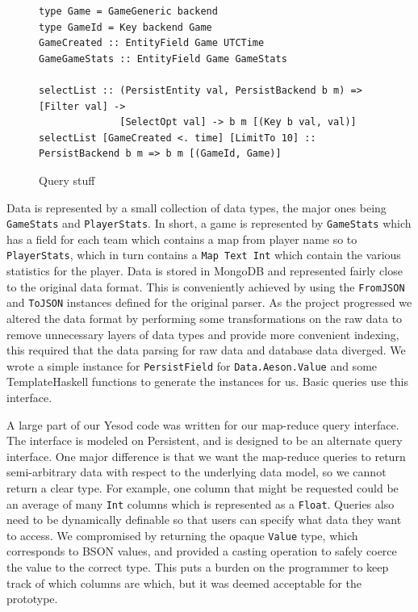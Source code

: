\documentclass{chi2009}
\newcommand{\code}[1]{\texttt{#1}}
\begin{document}
\begin{figure}[t]
\begin{verbatim}
type Game = GameGeneric backend
type GameId = Key backend Game
GameCreated :: EntityField Game UTCTime
GameGameStats :: EntityField Game GameStats

selectList :: (PersistEntity val, PersistBackend b m) => [Filter val] ->
              [SelectOpt val] -> b m [(Key b val, val)]
selectList [GameCreated <. time] [LimitTo 10] :: PersistBackend b m => b m [(GameId, Game)]
\end{verbatim}
    \caption{Query stuff}
    \label{querycode}
\end{figure}

Data is represented by a small collection of data types, the major ones being \code{GameStats} and \code{PlayerStats}.  In short, a game is represented by \code{GameStats} which has a field for each team which contains a map from player name so to \code{PlayerStats}, which in turn contains a \code{Map Text Int} which contain the various statistics for the player.  Data is stored in MongoDB and represented fairly close to the original data format.  This is conveniently achieved by using the \code{FromJSON} and \code{ToJSON} instances defined for the original parser.  As the project progressed we altered the data format by performing some transformations on the raw data to remove unnecessary layers of data types and provide more convenient indexing, this required that the data parsing for raw data and database data diverged.  We wrote a simple instance for \code{PersistField} for \code{Data.Aeson.Value} and some TemplateHaskell functions to generate the instances for us.  Basic queries use this interface.

A large part of our Yesod code was written for our map-reduce query interface.  The interface is modeled on Persistent, and is designed to be an alternate query interface.  One major difference is that we want the map-reduce queries to return semi-arbitrary data with respect to the underlying data model, so we cannot return a clear type.  For example, one column that might be requested could be an average of many \code{Int} columns which is represented as a \code{Float}.  Queries also need to be dynamically definable so that users can specify what data they want to access.  We compromised by returning the opaque \code{Value} type, which corresponds to BSON values, and provided a casting operation to safely coerce the value to the correct type.  This puts a burden on the programmer to keep track of which columns are which, but it was deemed acceptable for the prototype.
\end{document}
